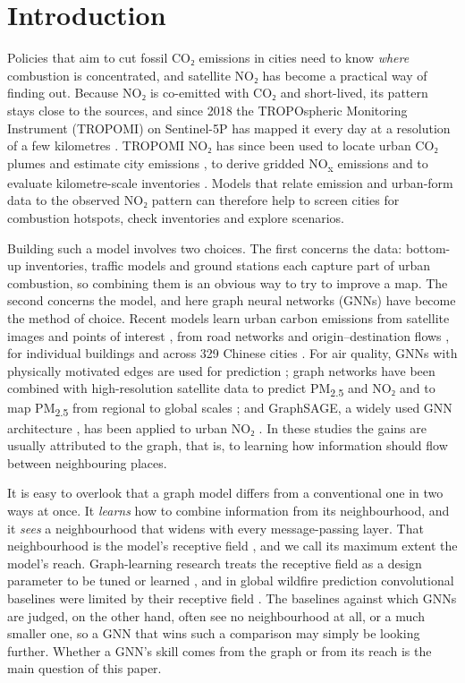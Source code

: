 \documentclass[pdflatex,sn-basic]{sn-jnl}
\begin{document}
\section{Introduction}\label{sec:intro}

Policies that aim to cut fossil CO₂ emissions in cities need to know \emph{where} combustion is concentrated, and satellite NO₂ has become a practical way of finding out. Because NO₂ is co-emitted with CO₂ and short-lived, its pattern stays close to the sources, and since 2018 the TROPOspheric Monitoring Instrument (TROPOMI) on Sentinel-5P has mapped it every day at a resolution of a few kilometres \citep{beirle2019,li2025}. TROPOMI NO₂ has since been used to locate urban CO₂ plumes and estimate city emissions \citep{reuter2019,ahn2025}, to derive gridded NO\textsubscript{x} emissions \citep{reypommier2025} and to evaluate kilometre-scale inventories \citep{goldberg2024}. Models that relate emission and urban-form data to the observed NO₂ pattern can therefore help to screen cities for combustion hotspots, check inventories and explore scenarios.

Building such a model involves two choices. The first concerns the data: bottom-up inventories, traffic models and ground stations each capture part of urban combustion, so combining them is an obvious way to try to improve a map. The second concerns the model, and here graph neural networks (GNNs) have become the method of choice. Recent models learn urban carbon emissions from satellite images and points of interest \citep{zeng2025}, from road networks and origin--destination flows \citep{zeng2024}, for individual buildings \citep{yap2025} and across 329 Chinese cities \citep{shao2026}. For air quality, GNNs with physically motivated edges are used for prediction \citep{wang2020,hettige2024}; graph networks have been combined with high-resolution satellite data to predict PM\textsubscript{2.5} and NO₂ \citep{wang2025} and to map PM\textsubscript{2.5} from regional to global scales \citep{bai2025,teng2026,yuan2026}; and GraphSAGE, a widely used GNN architecture \citep{hamilton2017}, has been applied to urban NO₂ \citep{gueterbock2025}. In these studies the gains are usually attributed to the graph, that is, to learning how information should flow between neighbouring places.

It is easy to overlook that a graph model differs from a conventional one in two ways at once. It \emph{learns} how to combine information from its neighbourhood, and it \emph{sees} a neighbourhood that widens with every message-passing layer. That neighbourhood is the model's receptive field \citep{luo2016}, and we call its maximum extent the model's reach. Graph-learning research treats the receptive field as a design parameter to be tuned or learned \citep{gao2025}, and in global wildfire prediction convolutional baselines were limited by their receptive field \citep{chen2026}. The baselines against which GNNs are judged, on the other hand, often see no neighbourhood at all, or a much smaller one, so a GNN that wins such a comparison may simply be looking further. Whether a GNN's skill comes from the graph or from its reach is the main question of this paper.
\end{document}
